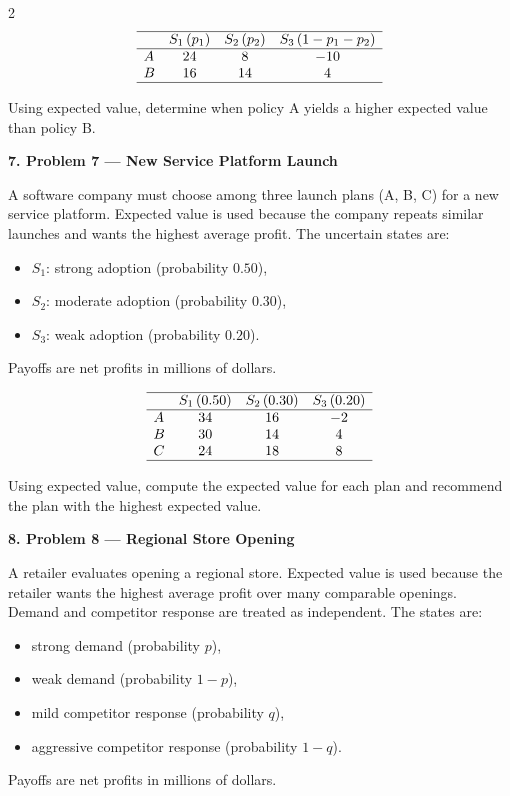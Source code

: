 \documentclass[12pt]{article}
\newcommand{\SubsectionBox}[1]{%
	\noindent\colorbox{gray!30}{%
		\parbox{\linewidth}{\textbf{#1}}%
	}\par\vspace{0.35cm}%
}
\begin{document}
\begin{multicols}{2}
				\[
				\begin{array}{lccc}
					\hline
					& S_1\,(p_1) & S_2\,(p_2) & S_3\,(1-p_1-p_2) \\
					\hline
					A & 24 & 8 & -10 \\
					B & 16 & 14 & 4 \\
					\hline
				\end{array}
				\]
				
				Using expected value, determine when policy A yields a higher expected value than policy B.

		\vspace{0.25cm}
		\SubsectionBox{7. Problem 7 --- New Service Platform Launch}\vspace{-0.25cm}
		A software company must choose among three launch plans (A, B, C) for a new service platform. Expected value is used because the company repeats similar launches and wants the highest average profit. The uncertain states are:
				\begin{itemize}
					\item \(S_1\): strong adoption (probability \(0.50\)),
					\item \(S_2\): moderate adoption (probability \(0.30\)),
					\item \(S_3\): weak adoption (probability \(0.20\)).
				\end{itemize}
				Payoffs are net profits in millions of dollars.
				
				\[
				\begin{array}{lccc}
					\hline
					& S_1\,(0.50) & S_2\,(0.30) & S_3\,(0.20) \\
					\hline
					A & 34 & 16 & -2 \\
					B & 30 & 14 & 4 \\
					C & 24 & 18 & 8 \\
					\hline
				\end{array}
				\]
				
				Using expected value, compute the expected value for each plan and recommend the plan with the highest expected value.

		\vspace{0.25cm}
		\SubsectionBox{8. Problem 8 --- Regional Store Opening}\vspace{-0.25cm}
		A retailer evaluates opening a regional store. Expected value is used because the retailer wants the highest average profit over many comparable openings. Demand and competitor response are treated as independent. The states are:
				\begin{itemize}
					\item strong demand (probability \(p\)),
					\item weak demand (probability \(1-p\)),
					\item mild competitor response (probability \(q\)),
					\item aggressive competitor response (probability \(1-q\)).
				\end{itemize}
				Payoffs are net profits in millions of dollars.
				

\end{multicols}
\end{document}
